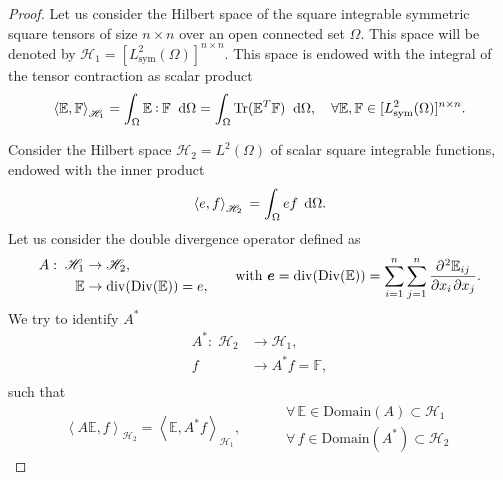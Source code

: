 \documentclass[preprint,12pt]{elsarticle}
\DeclareMathOperator{\Tr}{Tr}
\def\onedot{$\mathsurround0pt\ldotp$}
\def\cddot{%
	\mathbin{\vcenter{\baselineskip.67ex
			\hbox{\onedot}\hbox{\onedot}}%
}}
\begin{document}
	\begin{proof}
		Let us consider the Hilbert space of the square integrable symmetric square tensors of size $n \times n$ over an open connected set $\Omega$. This space will be denoted by $\mathscr{H}_1 = [L^2_{\text{sym}}(\Omega)]^{n \times n}$. This space is endowed with the integral of the tensor contraction as scalar product
		\[\left\langle \mathbb{E} , \mathbb{F} \right\rangle_{\mathscr{H}_1} = \int_{\Omega}  \mathbb{E} \cddot \mathbb{F} \; \d{\Omega} = \int_{\Omega} \Tr(\mathbb{E}^T \mathbb{F}) \; \d{\Omega}, \quad \forall  \mathbb{E} , \mathbb{F} \in [L^2_{\text{sym}}(\Omega)]^{n \times n}. \]
		
	Consider the Hilbert space $\mathscr{H}_2 =L^2(\Omega)$ of scalar square integrable functions, endowed with the inner product
	\begin{equation}
		\left\langle e,f \right\rangle_{\mathscr{H}_2}  \,= \int_{\Omega} e f \, \d{\Omega}.
	\end{equation} 
		 Let us consider the double divergence operator defined as 
	\[
	\begin{aligned}
	A: \; \mathscr{H}_1& \rightarrow \mathscr{H}_2, \\
	\mathbb{E}& \rightarrow \mathrm{div}(\mathrm{Div}(\mathbb{E})) = e, \\	\end{aligned}
	\qquad \text{with } \bm{e} = \mathrm{div}(\mathrm{Div}(\mathbb{E})) = \sum_{i = 1}^n \sum_{j = 1}^n \diffp{\mathbb{E}_{ij}}{x_i,x_j}.
	\]
	We try to identify $A^*$
	\[
	\begin{aligned}
	A^*: \; \mathscr{H}_2& \rightarrow \mathscr{H}_1, \\
	f& \rightarrow  A^* f = \mathbb{F}, \\
	\end{aligned}
	\]
	such that \[
	\left\langle A \mathbb{E} , f \right\rangle_{\mathscr{H}_2} = \left\langle \mathbb{E} , A^* f \right\rangle_{\mathscr{H}_1},
	\begin{aligned} \qquad
	&\forall \,\mathbb{E} \in \mathrm{Domain}(A) \subset \mathscr{H}_1 \\
	&\forall \,f \in \mathrm{Domain}(A^*) \subset \mathscr{H}_2
	\end{aligned}
	\]
	


\end{proof}
\end{document}
